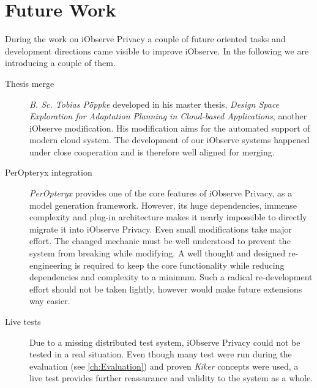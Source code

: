 \section{Future Work}
\label{sec:Conculsion:future}

During the work on iObserve Privacy a couple of future oriented tasks and development directions came visible to improve iObserve. In the following we are introducing a couple of them.

\begin{description}
	\item[Thesis merge]
	\textit{B. Sc. Tobias Pöppke} developed in his master thesis, \textit{Design Space Exploration for Adaptation Planning in Cloud-based Applications}, another iObserve modification. His modification aims for the automated support of modern cloud system. The development of our iObserve systems happened under close cooperation and is therefore well aligned for merging.
\end{description}

\begin{description}
	\item[PerOpteryx integration]
	\textit{PerOpteryx} provides one of the core features of iObserve Privacy, as a model generation framework. However, its huge dependencies, immense complexity and plug-in architecture makes it nearly impossible to directly migrate it into iObserve Privacy. Even small modifications take major effort. The changed mechanic must be well understood to prevent the system from breaking while modifying. A well thought and designed re-engineering is required to keep the core functionality while reducing dependencies and complexity to a minimum. Such a radical re-development effort should not be taken lightly, however would make future extensions way easier.
\end{description}

\begin{description}
	\item[Live tests]
	Due to a missing distributed test system, iObserve Privacy could not be tested in a real situation. Even though many test were run during the evaluation (see \autoref{ch:Evaluation}) and proven \textit{Kiker} concepts were used, a live test provides further reassurance and validity to the system as a whole. 
\end{description}









